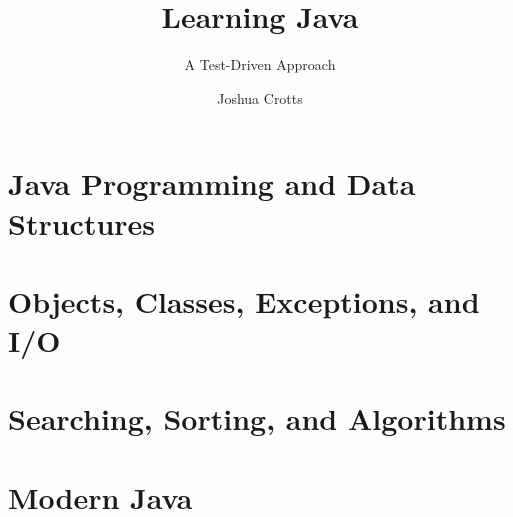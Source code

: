 \documentclass[graybox,envcountchap,sectrefs]{style/svmono}
\begin{document}


\author{Joshua Crotts}
\title{Learning Java}
\subtitle{A Test-Driven Approach}
\maketitle

\frontmatter%





\tableofcontents


\mainmatter%
\part{Java Programming and Data Structures}



\part{Objects, Classes, Exceptions, and I/O}


\part{Searching, Sorting, and Algorithms}


\part{Modern Java}




\backmatter%





\printindex

\end{document}
